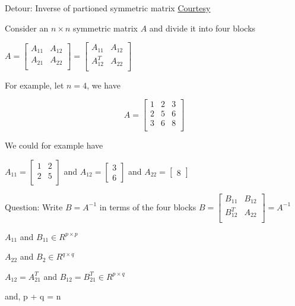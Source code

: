 \documentclass{beamer}
\begin{document}
\begin{frame}{Detour: Inverse of partioned symmetric matrix}
\href{http://fourier.eng.hmc.edu/e161/lectures/gaussianprocess/node6.html}{Courtesy}

Consider an $n\times n$ symmetric matrix $A$ and divide it into four blocks

$
A = \begin{bmatrix}
	A_{11} & A_{12}\\
	A_{21} & A_{22} \\
\end{bmatrix} =  \begin{bmatrix}
A_{11} & A_{12}\\
A_{12}^T & A_{22} \\
\end{bmatrix}
$

For example, let $n=4$, we have

$$
A =  \begin{bmatrix}
	1 & 2 & 3\\
	2 & 5 & 6 \\
	3 & 6 & 8 \\
	
\end{bmatrix}
$$

We could for example have 

$A_{11} = \begin{bmatrix}
1 & 2 \\
2 & 5 \\
\end{bmatrix}$ and $A_{12} = \begin{bmatrix}
3 \\ 6
\end{bmatrix}
$ and $A_{22} = \begin{bmatrix}
8
\end{bmatrix}$


\end{frame}

\begin{frame}
Question: Write $B = A^{-1}$ in terms of the four blocks
$
B = \begin{bmatrix}
	B_{11} & B_{12}\\
	B_{12}^T & A_{22} \\
\end{bmatrix}
= A^{-1}$

$A_{11}$ and $B_{11} \in R^{p\times p}$ 

$A_{22}$ and $B_{2} \in R^{q\times q}$

$A_{12} = A_{21}^T$ and $B_{12} = B_{21}^T \in R^{p\times q}$

and, p + q = n 
 
\end{frame}
\end{document}
